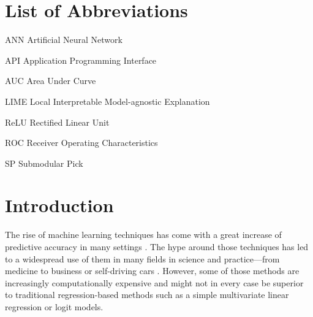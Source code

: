 \documentclass[12pt,a4paper]{article}
\begin{document}
\pagebreak
\pagestyle{plain}
\tableofcontents
\pagebreak
\listoffigures
\listoftables
\newpage
{}
 
\section*{List of Abbreviations}
 
\begin{abbrv}
 
\item[ANN]			Artificial Neural Network
\item[API]				Application Programming Interface
\item[AUC]			Area Under Curve
\item[LIME]			Local Interpretable Model-agnostic Explanation
\item[ReLU]			Rectified Linear Unit
\item[ROC]			Receiver Operating Characteristics
\item[SP]				Submodular Pick
 
\end{abbrv}
\newpage
\setcounter{page}{2}
\setlength{\baselineskip}{1.5\baselineskip}
\pagestyle{plain}


\section{Introduction}

The rise of machine learning techniques has come with a great increase
of predictive accuracy in many settings \citep{jordanMachineLearningTrends2015}. The hype around those techniques has led to a widespread use of them in many fields in science and practice---from medicine to business or self-driving cars \citep{chenMachineLearningPrediction2017}.
However, some of those methods are increasingly computationally expensive and might not in every case be superior to traditional regression-based methods such as a simple multivariate linear regression or logit models.
\end{document}
